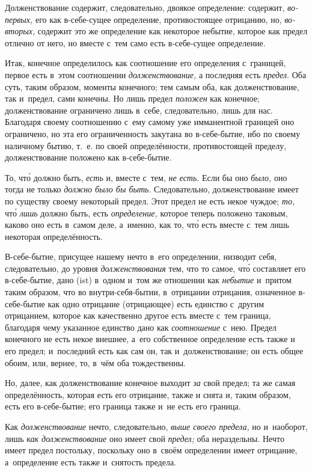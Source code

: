 Долженствование содержит, следовательно, двоякое определение: содержит,
{\em во-первых,} его как в-себе-сущее определение,
противостоящее отрицанию, но, {\em во-вторых,} содержит
это же определение как некоторое небытие, которое как предел отлично от
него, но вместе с~тем само есть в-себе-сущее определение.

Итак, конечное определилось как соотношение его определения с~границей,
первое есть в~этом соотношении {\em долженствование,} а
последняя есть {\em предел}. Оба суть, таким образом,
моменты конечного; тем самым оба, как долженствование, так и~предел, сами
конечны. Но лишь предел {\em положен} как конечное;
долженствование ограничено лишь в~себе, следовательно, лишь для нас.
Благодаря своему соотношению с~ему самому уже имманентной границей оно
ограничено, но эта его ограниченность закутана во в-себе-бытие, ибо по
своему наличному бытию, т.~е. по своей определённости, противостоящей
пределу, долженствование положено как в-себе-бытие.

То, чт\'{о} должно быть, {\em есть} и, вместе с~тем,
{\em не есть}. Если бы оно {\em было,} оно тогда не только
{\em должно было бы быть}. Следовательно,
долженствование имеет по существу своему некоторый предел. Этот предел не
есть некое чуждое; {\em то,} чт\'{о} {\em лишь} должно быть, есть
{\em определение,} которое теперь положено таковым,
каково оно есть в~самом деле, а~именно, как то, чт\'{о} есть вместе с~тем лишь
некоторая определённость.

В-себе-бытие, присущее нашему нечто в~его определении, низводит себя,
следовательно, до уровня {\em долженствования} тем, что
то самое, чт\'{о} составляет его в-себе-бытие, дано (ist) в~одном и~том же
отношении как {\em небытие} и~притом таким образом, что
во внутри-себя-бытии, в~отрицании отрицания, означенное в-себе-бытие как
одно отрицание (отрицающее) есть единство с~другим отрицанием, которое как
качественно другое есть вместе с~тем граница, благодаря чему указанное
единство дано как {\em соотношение} с~нею. Предел
конечного не есть некое внешнее, а~его собственное определение есть также и
его предел; и~последний есть как сам он, так и~долженствование; он есть
общее обоим, или, вернее, то, в~чём оба тождественны.

Но, далее, как долженствование конечное выходит {\em за}
свой предел; та же самая определённость, которая есть его отрицание, также
и снята и, таким образом, есть его в-себе-бытие; его граница также и~не
есть его граница.

Как {\em долженствование} нечто, следовательно,
{\em выше своего предела,} но и~наоборот, лишь
{\em как долженствование} оно имеет свой
{\em предел;} оба нераздельны. Нечто имеет предел
постольку, поскольку оно в~своём определении имеет отрицание, а~определение
есть также и~снятость предела.

